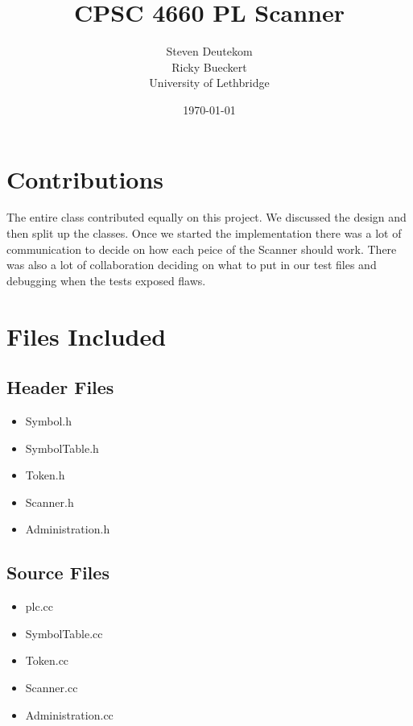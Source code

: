 \documentclass{article}
\begin{document}
\title{CPSC 4660 PL Scanner}
\author{Steven Deutekom\\
	Ricky Bueckert\\
	University of Lethbridge}
\date{\today}

\maketitle

\section{Contributions}
The entire class contributed equally on this project. We discussed the design and then split up the classes. Once we started the implementation there was a lot of communication to decide on how each peice of the Scanner should work. There was also a lot of collaboration deciding on what to put in our test files and debugging when the tests exposed flaws.

\section{Files Included}

\subsection{Header Files}
\begin{itemize}
	\item Symbol.h
	\item SymbolTable.h
	\item Token.h
	\item Scanner.h
	\item Administration.h
\end{itemize}

\subsection{Source Files}
\begin{itemize}
	\item plc.cc
	\item SymbolTable.cc
	\item Token.cc
	\item Scanner.cc
	\item Administration.cc
\end{itemize}
\end{document}
